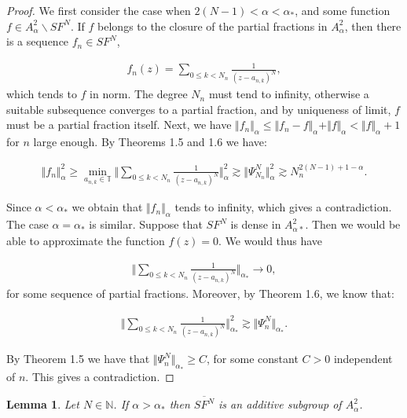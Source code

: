\documentclass{amsart}[11pt]
\newcommand{\N}{\mathbb{N}} %
\newcommand{\T}{\mathbb{T}} %
\newcommand{\no}[1]{\Vert #1 \Vert} %
\newcommand{\ra}{\rightarrow}
\newtheorem{lemma}[theorem]{Lemma}
\theoremstyle{definition}
\begin{document}
\begin{proof}
We first consider the case when $2(N-1) < \alpha < \alpha_{\ast}$, and some function $f \in A^2_{\alpha} \backslash SF^N$. If $f$ belongs to the closure of the partial fractions in $A^2_{\alpha}$, then there is a sequence $f_n \in SF^N$, 

\begin{gather*}
f_n(z) = \sum_{0 \leq k < N_n} \frac{1}{(z-a_{n,k})^N},
\end{gather*}
which tends to $f$ in norm. The degree $N_n$ must tend to infinity, otherwise a suitable subsequence converges to a partial fraction, and by uniqueness of limit, $f$ must be a partial fraction itself. Next, we have $ \no{f_n}_{\alpha} \leq \no{f_n-f}_{\alpha} + \no{f}_{\alpha} < \no{f}_{\alpha} + 1$ for $n$ large enough. By Theorems 1.5 and 1.6 we have:

\begin{gather*}
\no{f_n}_{\alpha}^2 \geq \min_{a_{n,k} \in \T} \bigg \Vert \sum_{0 \leq k < N_n} \frac{1}{(z- a_{n,k})^N} \bigg \Vert_{\alpha}^2 \gtrsim \no{\Psi_{N_n}^N}_{\alpha}^2 \gtrsim N_n^{2(N-1)+1 - \alpha}.
\end{gather*}

Since $\alpha < \alpha_{\ast}$ we obtain that $\no{f_n}_{\alpha}$ tends to infinity, which gives a contradiction. The case $\alpha = \alpha_{\ast}$ is similar. Suppose that $SF^N$ is dense in $A^2_{\alpha_{}\ast}$. Then we would be able to approximate the function $f(z) = 0$. We would thus have 

\begin{gather*}
      \bigg \Vert  \sum_{0 \leq k < N_n} \frac{1}{(z-a_{n,k})^N}\bigg \Vert_{\alpha_{\ast}} \ra 0,
\end{gather*}
for some sequence of partial fractions. Moreover, by Theorem 1.6, we know that:

\begin{gather*}
\bigg \Vert \sum_{0 \leq k < N_n} \frac{1}{(z-a_{n,k})^N} \bigg \Vert_{\alpha_{\ast}}^2 \gtrsim \Vert \Psi_n^N \Vert_{\alpha_{\ast}}.
\end{gather*}

By Theorem 1.5 we have that $ \Vert \Psi_n^N \Vert_{\alpha_{\ast} } \geq C$, for some constant $C>0$ independent of $n$. This gives a contradiction.
\end{proof}

\begin{lemma}
Let $N \in \N$. If $\alpha > \alpha_{\ast}$ then $\overline{SF^N}$ is an additive subgroup of $A^2_{\alpha}$.
\end{lemma}
\end{document}
